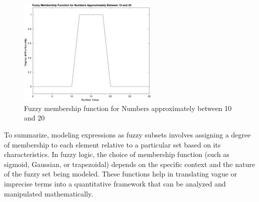 \begin{figure}[H]
	\centering
	\includegraphics[width=0.6\textwidth]{../Problem 7/number_range.pdf}
	\caption{Fuzzy membership function for Numbers approximately between 10 and 20}	
\end{figure}
\vspace{5mm}

To summarize, modeling expressions as fuzzy subsets involves assigning a degree of membership to each element relative to a particular set based on its characteristics. 
In fuzzy logic, the choice of membership function (such as sigmoid, Gaussian, or trapezoidal) depends on the specific context and the nature of the fuzzy set being modeled. These functions help in translating vague or imprecise terms into a quantitative framework that can be analyzed and manipulated mathematically.